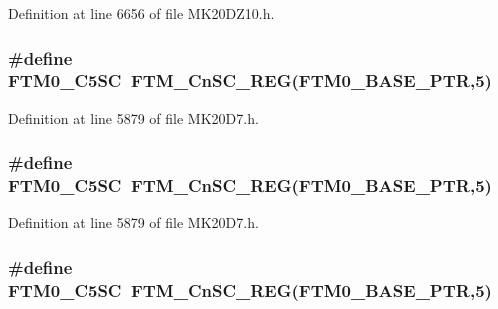 Definition at line 6656 of file M\+K20\+D\+Z10.\+h.

\subsubsection[{\texorpdfstring{F\+T\+M0\+\_\+\+C5\+SC}{FTM0_C5SC}}]{\setlength{\rightskip}{0pt plus 5cm}\#define F\+T\+M0\+\_\+\+C5\+SC~{\bf F\+T\+M\+\_\+\+Cn\+S\+C\+\_\+\+R\+EG}({\bf F\+T\+M0\+\_\+\+B\+A\+S\+E\+\_\+\+P\+TR},5)}\hypertarget{group___f_t_m___register___accessor___macros_gaf6658bca08e8ceee14267b2d264a5428}{}\label{group___f_t_m___register___accessor___macros_gaf6658bca08e8ceee14267b2d264a5428}


Definition at line 5879 of file M\+K20\+D7.\+h.

\subsubsection[{\texorpdfstring{F\+T\+M0\+\_\+\+C5\+SC}{FTM0_C5SC}}]{\setlength{\rightskip}{0pt plus 5cm}\#define F\+T\+M0\+\_\+\+C5\+SC~{\bf F\+T\+M\+\_\+\+Cn\+S\+C\+\_\+\+R\+EG}({\bf F\+T\+M0\+\_\+\+B\+A\+S\+E\+\_\+\+P\+TR},5)}\hypertarget{group___f_t_m___register___accessor___macros_gaf6658bca08e8ceee14267b2d264a5428}{}\label{group___f_t_m___register___accessor___macros_gaf6658bca08e8ceee14267b2d264a5428}


Definition at line 5879 of file M\+K20\+D7.\+h.

\subsubsection[{\texorpdfstring{F\+T\+M0\+\_\+\+C5\+SC}{FTM0_C5SC}}]{\setlength{\rightskip}{0pt plus 5cm}\#define F\+T\+M0\+\_\+\+C5\+SC~{\bf F\+T\+M\+\_\+\+Cn\+S\+C\+\_\+\+R\+EG}({\bf F\+T\+M0\+\_\+\+B\+A\+S\+E\+\_\+\+P\+TR},5)}\hypertarget{group___f_t_m___register___accessor___macros_gaf6658bca08e8ceee14267b2d264a5428}{}\label{group___f_t_m___register___accessor___macros_gaf6658bca08e8ceee14267b2d264a5428}


